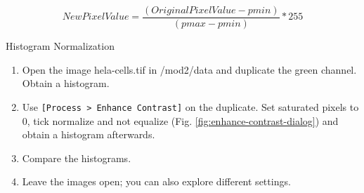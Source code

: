 \begin{equation*}
\mathit{NewPixelValue}=\frac{(\mathit{OriginalPixelValue}-\mathit{pmin})}{(\mathit{pmax}-\mathit{pmin})}\ast
255
\end{equation*}

\begin{taskbox}{Histogram Normalization}

\begin{enumerate}
	\item Open the image hela-cells.tif in /mod2/data and duplicate the green channel. Obtain a histogram.
	\item Use \texttt{[Process > Enhance Contrast]} on the duplicate. Set saturated pixels to 0, tick normalize and not equalize (Fig. \ref{fig:enhance-contrast-dialog}) and obtain a histogram afterwards.
	
	\begin{minipage}[t]{\linewidth}
		\begin{center}
		\medskip
		\label{fig:enhance-contrast-dialog}
		\end{center}
	\end{minipage}
	
	\item Compare the histograms. 
	\item Leave the images open; you can also explore different settings.
	
	\end{enumerate}
\end{taskbox}


